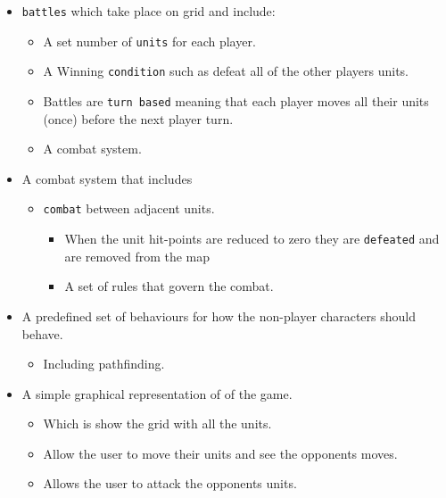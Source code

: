 \begin{itemize}
\begin{itemize}
	\item \texttt{battles} which take place on grid and include:
	\begin{itemize}
		\item A set number of \texttt{units} for each player.
		\item A Winning \texttt{condition} such as defeat all of the other players units.
		\item Battles are \texttt{turn based} meaning that each player moves all their units (once) before the next player turn.   
		\item A combat system.
	\end{itemize}
	
	\item A combat system that includes
		\begin{itemize}
			\item \texttt{combat} between adjacent units.
			\begin{itemize}
				\item When the unit hit-points are reduced to zero they are \texttt{defeated} and are removed from the map
			\item A set of rules that govern the combat.
			\end{itemize}
			
		\end{itemize}
	
	\item A predefined set of behaviours for how the non-player characters should behave.
	\begin{itemize}
		\item Including pathfinding.
	\end{itemize}
	
	\item A simple graphical representation of of the game.
	\begin{itemize}
		\item Which is show the grid with all the units.
		
		\item Allow the user to move their units and see the opponents moves.
		
		\item Allows the user to attack the opponents units.
	\end{itemize}
\end{itemize}
\end{itemize}

